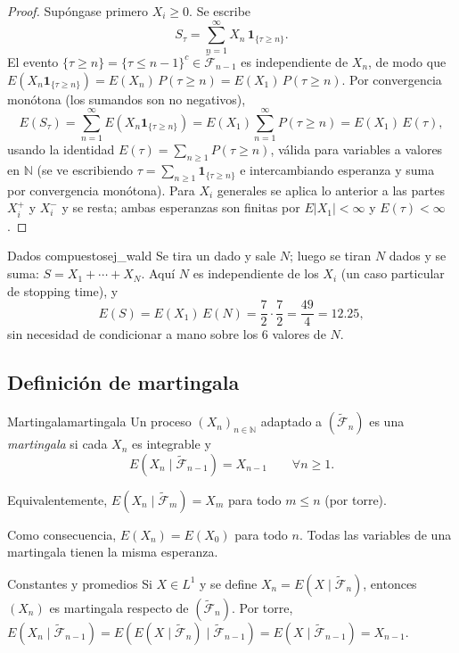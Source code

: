 \documentclass[11pt, a4paper]{article}
\begin{document}
\begin{proof}
Supóngase primero $X_i \ge 0$. Se escribe
$$ S_\tau = \sum_{n=1}^\infty X_n \, \mathbf{1}_{\{\tau \ge n\}}. $$
El evento $\{\tau \ge n\} = \{\tau \le n - 1\}^c \in \widetilde{\mathcal{F}}_{n-1}$ es
independiente de $X_n$, de modo que
$E(X_n \mathbf{1}_{\{\tau \ge n\}}) = E(X_n) \, P(\tau \ge n) = E(X_1) \, P(\tau \ge n)$. Por
convergencia monótona (los sumandos son no negativos),
$$ E(S_\tau) = \sum_{n=1}^\infty E(X_n \mathbf{1}_{\{\tau \ge n\}}) = E(X_1)
\sum_{n=1}^\infty P(\tau \ge n) = E(X_1) \, E(\tau), $$
usando la identidad $E(\tau) = \sum_{n \ge 1} P(\tau \ge n)$, válida para variables a valores
en $\mathbb{N}$ (se ve escribiendo $\tau = \sum_{n \ge 1} \mathbf{1}_{\{\tau \ge n\}}$ e
intercambiando esperanza y suma por convergencia monótona). Para $X_i$ generales se aplica lo
anterior a las partes $X_i^+$ y $X_i^-$ y se resta; ambas esperanzas son finitas por
$E|X_1| < \infty$ y $E(\tau) < \infty$.
\end{proof}

\begin{ejemplo}{Dados compuestos}{ej_wald}
Se tira un dado y sale $N$; luego se tiran $N$ dados y se suma: $S = X_1 + \cdots + X_N$. Aquí
$N$ es independiente de los $X_i$ (un caso particular de stopping time), y
$$ E(S) = E(X_1) \, E(N) = \frac{7}{2} \cdot \frac{7}{2} = \frac{49}{4} = 12.25, $$
sin necesidad de condicionar a mano sobre los $6$ valores de $N$.
\end{ejemplo}

\subsection{Definición de martingala}

\begin{definicion}{Martingala}{martingala}
Un proceso $(X_n)_{n \in \mathbb{N}}$ adaptado a $(\widetilde{\mathcal{F}}_n)$ es una
\emph{martingala} si cada $X_n$ es integrable y
$$ E(X_n \mid \widetilde{\mathcal{F}}_{n-1}) = X_{n-1} \qquad \forall n \ge 1. $$
\end{definicion}

\obs Equivalentemente, $E(X_n \mid \widetilde{\mathcal{F}}_m) = X_m$ para todo $m \le n$ (por
torre).

\obs Como consecuencia, $E(X_n) = E(X_0)$ para todo $n$. Todas las variables de una martingala
tienen la misma esperanza.

\begin{ejemplo}{Constantes y promedios}{}
Si $X \in L^1$ y se define $X_n = E(X \mid \widetilde{\mathcal{F}}_n)$, entonces $(X_n)$ es
martingala respecto de $(\widetilde{\mathcal{F}}_n)$. Por torre,
$E(X_n \mid \widetilde{\mathcal{F}}_{n-1}) = E(E(X \mid \widetilde{\mathcal{F}}_n) \mid
\widetilde{\mathcal{F}}_{n-1}) = E(X \mid \widetilde{\mathcal{F}}_{n-1}) = X_{n-1}$.
\end{ejemplo}
\end{document}
